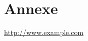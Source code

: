 \documentclass[a4paper]{article}
\begin{document}










\newpage \appendix










\section{Annexe}













\newpage \tableofcontents
\newpage {} \listoffigures
\newpage {}
\begin{thebibliography}{9}
 {\small \url{http://www.example.com}}
\end{thebibliography}
\end{document}
